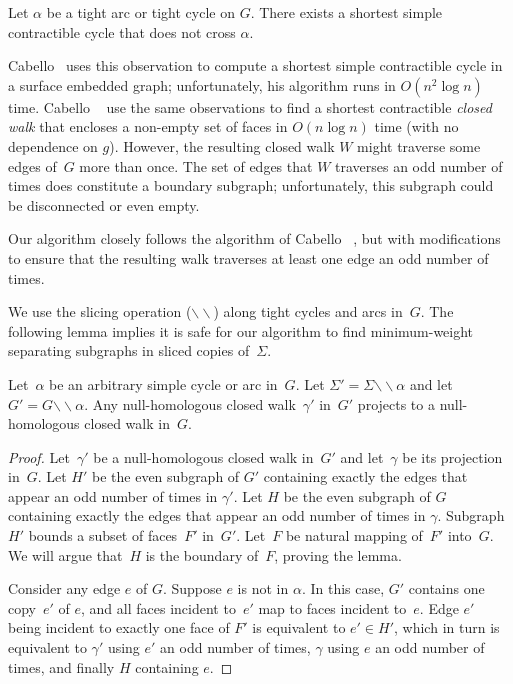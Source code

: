 \documentclass[letterpaper,review]{siamart190516}
\def\snip{\mathbin{\raisebox{0.15ex}{\rotatebox[origin=c]{60}{\Rightscissors}\!}}}
\def\snip{\mathbin{\backslash\!\!\backslash}}
\def\subsnip{\mathbin{\raisebox{0.15ex}{\rotatebox[origin=c]{60}{\footnotesize\Rightscissors}\!}}}
\def\Gsnip{\mathord{G_{\subsnip}}}
\def\Sigmasnip{\mathord{\Sigma_{\subsnip}}}
\def\gammasnip{\mathord{\gamma_{\subsnip}}}
\def\Gsnip{G'}
\def\Fsnip{F'}
\def\Sigmasnip{\Sigma'}
\def\gammasnip{\gamma'}
\def\Hsnip{H'}
\begin{document}
{\begin{lemma}
\label{lem:disjoint-tight-arc}
Let $\alpha$ be a tight arc or tight cycle on $G$.  There exists a shortest simple contractible cycle that does not cross $\alpha$.
\end{lemma}

Cabello~\cite{c-fscss-10} uses this observation to compute a shortest simple contractible cycle in a surface embedded graph; unfortunately, his algorithm runs in $O(n^2\log n)$ time.
Cabello \etal~\cite{cdem-fotc-10} use the same observations to find a shortest contractible \emph{closed walk} that encloses a non-empty set of faces in $O(n\log n)$ time (with no dependence on $g$).
However, the resulting closed walk $W$ might traverse some edges of~$G$ more than once.  The set of edges that $W$ traverses an odd number of times does constitute a boundary subgraph; unfortunately, this subgraph could be disconnected or even empty.

Our algorithm closely follows the algorithm of Cabello \etal~\cite{cdem-fotc-10}, but with modifications to ensure that the resulting walk traverses at least one edge an odd number of times.

We use the slicing operation ($\snip$) along tight cycles and arcs in~$G$.  The following lemma
implies it is safe for our algorithm to find minimum-weight separating subgraphs in sliced copies
of~$\Sigma$.

\begin{lemma}
\label{lem:global_null-homologous-projections}
Let~$\alpha$ be an arbitrary simple cycle or arc in~$G$.
Let
${\Sigmasnip = \Sigma \snip \alpha}$ and let~$\Gsnip = G \snip \alpha$. Any null-homologous closed
walk~$\gammasnip$ in~$\Gsnip$ projects  to a null-homologous closed walk in~$G$.
\end{lemma}

\begin{proof}
Let~$\gammasnip$ be a null-homologous closed walk in~$\Gsnip$ and let~$\gamma$ be its projection in~$G$.
Let $\Hsnip$ be the even subgraph of $\Gsnip$ containing exactly the edges that appear an odd number of
times in $\gammasnip$.
Let $H$ be the even subgraph of $G$ containing exactly the edges that appear an odd number of times
in $\gamma$.
Subgraph~$\Hsnip$ bounds a subset of faces~$\Fsnip$ in~$\Gsnip$. 
Let~$F$ be natural mapping of~$\Fsnip$ into~$G$.
We will argue that~$H$ is the boundary of~$F$, proving the lemma.

Consider any edge $e$ of $G$.
Suppose $e$ is not in $\alpha$.
In this case, $\Gsnip$ contains one copy~$e'$ of $e$, and all faces incident to~$e'$ map to faces
incident to~$e$.
Edge $e'$ being incident to exactly one face of $\Fsnip$ is equivalent to $e' \in H'$, which in turn
is equivalent to $\gammasnip$ using $e'$ an odd number of times, $\gamma$ using $e$ an odd number of
times, and finally $H$ containing $e$.


\end{proof}}
\end{document}
